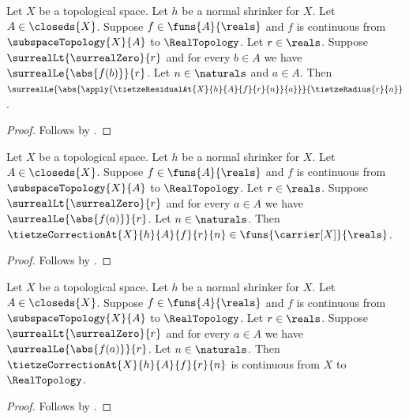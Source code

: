 \begin{corollary}\label{tietze_residual_bound}
    Let $X$ be a topological space.
    Let $h$ be a normal shrinker for $X$.
    Let $A\in\closeds{X}$.
    Suppose $f\in\funs{A}{\reals}$ and $f$ is continuous from
        $\subspaceTopology{X}{A}$ to $\RealTopology$.
    Let $r\in\reals$.
    Suppose $\surrealLt{\surrealZero}{r}$ and
        for every $b\in A$ we have $\surrealLe{\abs{f(b)}}{r}$.
    Let $n\in\naturals$ and $a\in A$.
    Then
        $\surrealLe{
            \abs{\apply{\tietzeResidualAt{X}{h}{A}{f}{r}{n}}{a}}}
            {\tietzeRadius{r}{n}}$.
\end{corollary}
\begin{proof}
    Follows by
        .
\end{proof}

\begin{corollary}\label{tietze_correction_typed}
    Let $X$ be a topological space.
    Let $h$ be a normal shrinker for $X$.
    Let $A\in\closeds{X}$.
    Suppose $f\in\funs{A}{\reals}$ and $f$ is continuous from
        $\subspaceTopology{X}{A}$ to $\RealTopology$.
    Let $r\in\reals$.
    Suppose $\surrealLt{\surrealZero}{r}$ and
        for every $a\in A$ we have $\surrealLe{\abs{f(a)}}{r}$.
    Let $n\in\naturals$.
    Then $\tietzeCorrectionAt{X}{h}{A}{f}{r}{n}
        \in\funs{\carrier[X]}{\reals}$.
\end{corollary}
\begin{proof}
    Follows by
        .
\end{proof}

\begin{corollary}\label{tietze_correction_continuous}
    Let $X$ be a topological space.
    Let $h$ be a normal shrinker for $X$.
    Let $A\in\closeds{X}$.
    Suppose $f\in\funs{A}{\reals}$ and $f$ is continuous from
        $\subspaceTopology{X}{A}$ to $\RealTopology$.
    Let $r\in\reals$.
    Suppose $\surrealLt{\surrealZero}{r}$ and
        for every $a\in A$ we have $\surrealLe{\abs{f(a)}}{r}$.
    Let $n\in\naturals$.
    Then $\tietzeCorrectionAt{X}{h}{A}{f}{r}{n}$ is continuous from
        $X$ to $\RealTopology$.
\end{corollary}
\begin{proof}
    Follows by
        .
\end{proof}

